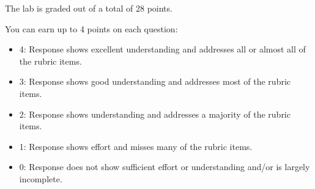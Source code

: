 \documentclass[
  letterpaper,
  DIV=11,
  numbers=noendperiod]{scrartcl}
\begin{document}
The lab is graded out of a total of 28 points.

You can earn up to 4 points on each question:

\begin{itemize}
\item
  4: Response shows excellent understanding and addresses all or almost
  all of the rubric items.
\item
  3: Response shows good understanding and addresses most of the rubric
  items.
\item
  2: Response shows understanding and addresses a majority of the rubric
  items.
\item
  1: Response shows effort and misses many of the rubric items.
\item
  0: Response does not show sufficient effort or understanding and/or is
  largely incomplete.
\end{itemize}
\end{document}
